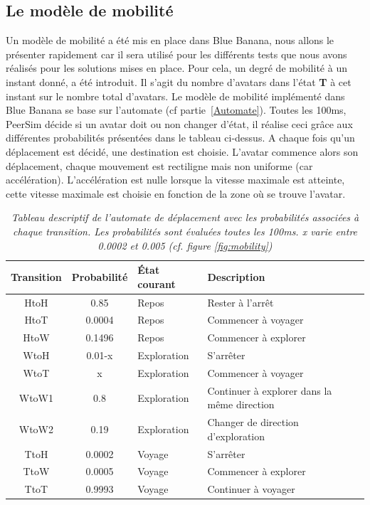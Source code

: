 \subsection{Le modèle de mobilité}

Un modèle de mobilité a été mis en place dans Blue Banana, nous allons le présenter rapidement car il sera utilisé pour les différents tests que nous avons réalisés pour les solutions mises en place. Pour cela, un degré de mobilité à un instant donné, a été introduit. Il s'agit du nombre d'avatars dans l'état \textbf{T} à cet instant sur le nombre total d'avatars. Le modèle de mobilité implémenté dans Blue Banana se base sur l'automate (cf partie~\ref{Automate}). Toutes les 100ms, PeerSim décide si un avatar doit ou non changer d'état, il réalise ceci grâce aux différentes probabilités présentées dans le tableau ci-dessus. A chaque fois qu'un déplacement est décidé, une destination est choisie. L'avatar commence alors son déplacement, chaque mouvement est rectiligne mais non uniforme (car accélération). L'accélération est nulle lorsque la vitesse maximale est atteinte, cette vitesse maximale est choisie en fonction de la zone où se trouve l'avatar.

\begin{table}
  \begin{center}
    \begin{tabular}{|c|c|l|l|}
      \hline
      Transition & Probabilité & État courant & Description\\
      \hline
      HtoH & 0.85 & Repos & Rester à l'arrêt\\
      HtoT & 0.0004 & Repos & Commencer à voyager\\
      HtoW & 0.1496 & Repos & Commencer à explorer\\
      WtoH & 0.01-x & Exploration & S'arrêter\\
      WtoT & x & Exploration & Commencer à voyager\\
      WtoW1 & 0.8 & Exploration & Continuer à explorer dans la même direction\\
      WtoW2 & 0.19 & Exploration & Changer de direction d'exploration\\
      TtoH & 0.0002 & Voyage & S'arrêter\\
      TtoW & 0.0005 & Voyage & Commencer à explorer\\
      TtoT & 0.9993 & Voyage & Continuer à voyager\\
      \hline
    \end{tabular}
  \end{center}
  \label{tab:automate}
  \caption{\textit{\small Tableau descriptif de l'automate de
      déplacement avec les probabilités associées à chaque
      transition. Les probabilités sont évaluées toutes les 100ms. x
      varie entre 0.0002 et 0.005 (cf. figure \ref{fig:mobility})}}
\end{table}

